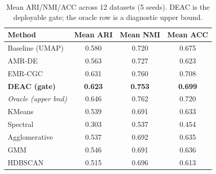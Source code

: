\begin{table}[!t]
\centering
\caption{Mean ARI/NMI/ACC across 12 datasets (5 seeds). DEAC is the deployable gate; the oracle row is a diagnostic upper bound.}
\label{tab:multi_metric}
\footnotesize
\begin{tabular}{lccc}
\toprule
Method & Mean ARI & Mean NMI & Mean ACC \\
\midrule
Baseline (UMAP) & 0.580 & 0.720 & 0.675 \\
AMR-DE & 0.563 & 0.727 & 0.623 \\
EMR-CGC & 0.631 & 0.760 & 0.708 \\
\textbf{DEAC (gate)} & \textbf{0.623} & \textbf{0.753} & \textbf{0.699} \\
\textit{Oracle (upper bnd)} & 0.646 & 0.762 & 0.720 \\
\midrule
KMeans & 0.539 & 0.691 & 0.633 \\
Spectral & 0.303 & 0.537 & 0.454 \\
Agglomerative & 0.537 & 0.692 & 0.635 \\
GMM & 0.546 & 0.691 & 0.636 \\
HDBSCAN & 0.515 & 0.696 & 0.613 \\
\bottomrule
\end{tabular}
\end{table}

